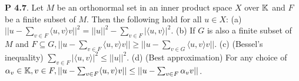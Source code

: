{\bf P 4.7}. Let $M$ be an orthonormal set in an inner product space $X$ over $\mathbb{K}$ and $F$ be a finite subset of $M$. Then the following hold for all $u \in X$:  (a) $||u-\sum_{v \in F}\langle u,v \rangle v||^2 = ||u||^2-\sum_{v \in F}|\langle u,v \rangle |^2 $. (b) If $G$ is also a finite subset of $M$ and $F \subseteq G, ||u-\sum_{v \in F}\langle u,v \rangle v|| \geq ||u-\sum_{v \in G}\langle u,v \rangle v||$. (c) (Bessel's inequality) $\sum_{v \in F}|\langle u,v \rangle|^2\leq ||u||^2$.  (d) (Best approximation) For any choice of $\alpha_v \in \mathbb{K}, v \in F, ||u-\sum_{v \in F}\langle u,v \rangle v||\leq ||u-\sum_{v \in F}\alpha_v v||$. 
